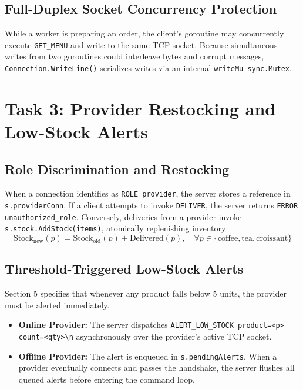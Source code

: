 \documentclass{labreport}
\begin{document}
\subsection{Full-Duplex Socket Concurrency Protection}
While a worker is preparing an order, the client's goroutine may concurrently execute \texttt{GET\_MENU} and write to the same TCP socket. Because simultaneous writes from two goroutines could interleave bytes and corrupt messages, \texttt{Connection.WriteLine()} serializes writes via an internal \texttt{writeMu sync.Mutex}.

\newpage

\section{Task 3: Provider Restocking and Low-Stock Alerts}

\subsection{Role Discrimination and Restocking}
When a connection identifies as \texttt{ROLE provider}, the server stores a reference in \texttt{s.providerConn}. If a client attempts to invoke \texttt{DELIVER}, the server returns \texttt{ERROR unauthorized\_role}. Conversely, deliveries from a provider invoke \texttt{s.stock.AddStock(items)}, atomically replenishing inventory:
\begin{equation}
\text{Stock}_{\text{new}}(p) = \text{Stock}_{\text{old}}(p) + \text{Delivered}(p), \quad \forall p \in \{\text{coffee}, \text{tea}, \text{croissant}\}
\end{equation}

\subsection{Threshold-Triggered Low-Stock Alerts}
Section 5 specifies that whenever any product falls below 5 units, the provider must be alerted immediately.
\begin{itemize}
    \item \textbf{Online Provider:} The server dispatches \texttt{ALERT\_LOW\_STOCK product=<p> count=<qty>\textbackslash n} asynchronously over the provider's active TCP socket.
    \item \textbf{Offline Provider:} The alert is enqueued in \texttt{s.pendingAlerts}. When a provider eventually connects and passes the handshake, the server flushes all queued alerts before entering the command loop.
\end{itemize}
\end{document}
